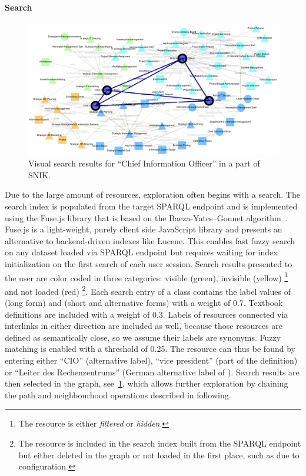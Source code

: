 \documentclass[conference]{IEEEtran}
\begin{document}
\paragraph{Search}
\begin{figure}[h!]
    \centering
    \includegraphics[width=\columnwidth]{img/search.pdf}
    \caption{Visual search results for \enquote{Chief Information Officer} in a part of SNIK.}\label{fig:search}
\end{figure}

Due to the large amount of resources, exploration often begins with a search.
The search index is populated from the target SPARQL endpoint and is implemented using the Fuse.js library that is based on the Baeza-Yates--Gonnet algorithm~\cite{textsearching}.
Fuse.js\footnotemark{} is a light-weight, purely client side JavaScript library and presents an alternative to backend-driven indexes like Lucene.%
This enables fast fuzzy search on any dataset loaded via SPARQL endpoint but requires waiting for index initialization on the first search of each user session.
Search results presented to the user are color coded in three categories: visible (green), invisible (yellow)%
\footnote{The resource is either \emph{filtered} or \emph{hidden}.}%
 and not loaded (red)%
\footnote{The resource is included in the search index built from the SPARQL endpoint but either deleted in the graph or not loaded in the first place, such as due to configuration.}.
Each search entry of a class contains the label values of  (long form) and  (short and alternative forms) with a weight of 0.7.
Textbook definitions are included with a weight of 0.3.
Labels of resources connected via  interlinks in either direction are included as well, because those resources are defined as semantically close, so we assume their labels are synonyms.
Fuzzy matching is enabled with a threshold of \num{0.25}.
The resource  can thus be found by entering either \enquote{CIO} (alternative label), \enquote{vice president} (part of the definition) or \enquote{Leiter des Rechenzentrums} (German alternative label of ).
Search results are then selected in the graph, see~\cref{fig:search}, which allows further exploration by chaining the path and neighbourhood operations described in following.
\end{document}

